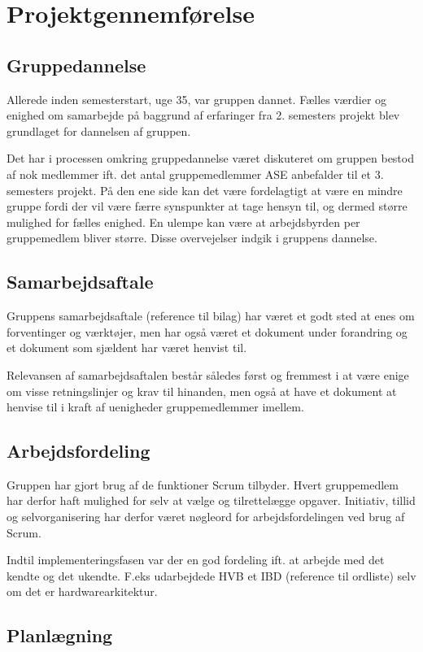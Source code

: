 \chapter*{Projektgennemførelse}
\section*{Gruppedannelse}
Allerede inden semesterstart, uge 35, var gruppen dannet. Fælles værdier og enighed om samarbejde på baggrund af erfaringer fra 2. semesters projekt blev grundlaget for dannelsen af gruppen.

Det har i processen omkring gruppedannelse været diskuteret om gruppen bestod af nok medlemmer ift. det antal gruppemedlemmer ASE anbefalder til et 3. semesters projekt. På den ene side kan det være fordelagtigt at være en mindre gruppe fordi der vil være færre synspunkter at tage hensyn til, og dermed større mulighed for fælles enighed. En ulempe kan være at arbejdsbyrden per gruppemedlem bliver større. Disse overvejelser indgik i gruppens dannelse.\\

\section*{Samarbejdsaftale}
Gruppens samarbejdsaftale (reference til bilag) har været et godt sted at enes om forventinger og værktøjer, men har også været et dokument under forandring og et dokument som sjældent har været henvist til. 

Relevansen af samarbejdsaftalen består således først og fremmest i at være enige om visse retningslinjer og krav til hinanden, men også at have et dokument at henvise til i kraft af uenigheder gruppemedlemmer imellem.

\section*{Arbejdsfordeling}
Gruppen har gjort brug af de funktioner Scrum tilbyder. Hvert gruppemedlem har derfor haft mulighed for selv at vælge og tilrettelægge opgaver. Initiativ, tillid og selvorganisering har derfor været nøgleord for arbejdsfordelingen ved brug af Scrum.

Indtil implementeringsfasen var der en god fordeling ift. at arbejde med det kendte og det ukendte. F.eks udarbejdede HVB et IBD (reference til ordliste) selv om det er hardwarearkitektur.

\section*{Planlægning}

